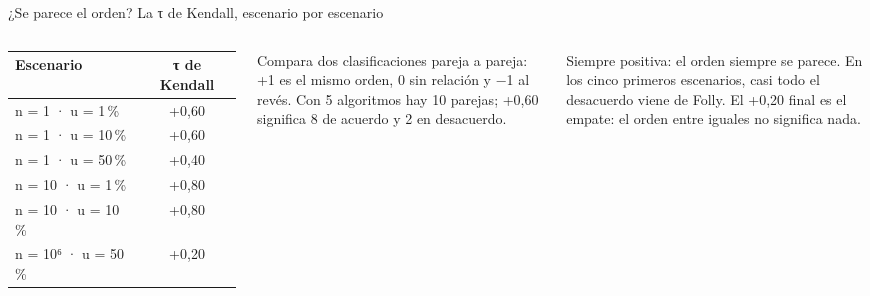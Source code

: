 \begin{frame}{¿Se parece el orden? La τ de Kendall, escenario por escenario}
  \begin{columns}[T,onlytextwidth]
    \footnotesize
    \begin{tabular}{@{}lc@{}}
      \toprule
      \textbf{Escenario} & \textbf{τ de Kendall}\\
      \midrule
      n = 1 · u = 1\,\% & +0,60\\
      n = 1 · u = 10\,\% & +0,60\\
      n = 1 · u = 50\,\% & +0,40\\
      n = 10 · u = 1\,\% & +0,80\\
      n = 10 · u = 10\,\% & +0,80\\
      n = 10⁶ · u = 50\,\% & +0,20\\
      \bottomrule
    \end{tabular}
    \begin{porque}
      Compara dos clasificaciones pareja a pareja: +1 es el mismo orden, 0 sin relación y −1 al revés. Con 5 algoritmos hay 10 parejas; +0,60 significa 8 de acuerdo y 2 en desacuerdo.
    \end{porque}
    \begin{idea}\footnotesize Siempre positiva: el orden siempre se parece. En los cinco primeros escenarios, casi todo el desacuerdo viene de Folly. El +0,20 final es el empate: el orden entre iguales no significa nada.\end{idea}
  \end{columns}
\end{frame}
